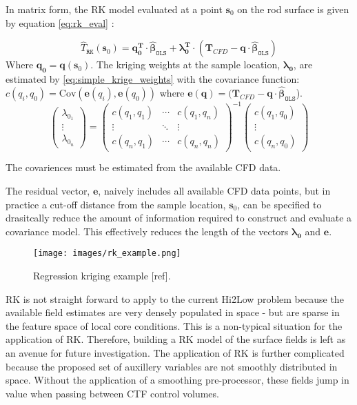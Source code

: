 In matrix form, the RK model evaluated at a point $\mathbf{s}_0 $ on the rod surface is given by equation \ref{eq:rk_eval} \cite{Hengl07}:

\begin{equation}
\hat T_\mathtt{RK}(\mathbf{s}_0 ) = \mathbf{q}_\mathbf{0}^\mathbf{T} \cdot \mathbf{\hat \beta}_\mathtt{OLS} + \mathbf{\lambda }_\mathbf{0}^\mathbf{T} \cdot (\mathbf T_{CFD}
- \mathbf{q} \cdot \mathbf{\hat \beta }_\mathtt{OLS} )
\label{eq:rk_eval}
\end{equation}
Where $\mathbf{q}_\mathbf{0}= \mathbf{q}(\mathbf s_0)$. The kriging weights at the sample location, $\mathbf{\lambda_0}$, are estimated by \ref{eq:simple_krige_weights} with the covariance function: $c(q_i, q_0)= \mathrm{Cov}(\mathbf e(q_i), \mathbf e(q_0))$ where $\mathbf e(\mathbf q) = (\mathbf T_{CFD} - \mathbf{q} \cdot \mathbf{\hat \beta }_\mathtt{OLS}$). 
\begin{equation}
\begin{pmatrix}\lambda_{0_1} \\ \vdots \\ \lambda_{0_n} \end{pmatrix}=
\begin{pmatrix}c(q_1,q_1) & \cdots & c(q_1,q_n) \\
\vdots & \ddots & \vdots  \\
c(q_n,q_1) & \cdots & c(q_n,q_n) 
\end{pmatrix}^{-1}
\begin{pmatrix}c(q_1,q_0) \\ \vdots \\ c(q_n,q_0) \end{pmatrix}
\label{eq:simple_krige_weights}
\end{equation}

The covariences must be estimated from the available CFD data.  

The residual vector, $\mathbf e$, naively includes all available CFD data points, but in practice a cut-off distance from the sample location, $\mathbf s_0$, can be specified to drasitcally reduce the amount of information required to construct and evaluate a covariance model.  This effectively reduces the length of the vectors $\mathbf{\lambda_0}$ and $\mathbf e$.

\begin{figure}[hbtp]
\centering
\texttt{[image: images/rk\_example.png]}
\caption{Regression kriging example [ref].}
\label{fit:rk}
\end{figure}

RK is not straight forward to apply to the current Hi2Low problem because the available field estimates are very densely populated in space - but are sparse in the feature space of local core conditions. This is a non-typical situation for the application of RK. Therefore, building a RK model of the surface fields is left as an avenue for future investigation.
The application of RK is further complicated because the proposed set of auxillery variables are not smoothly distributed in space.  Without the application of a smoothing pre-processor, these
fields jump in value when passing between CTF control volumes.

